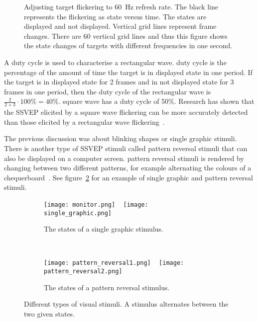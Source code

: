 \begin{figure}[h]
	\centering
	
	\caption{Adjusting target flickering to \SI{60}{Hz} refresh rate. The black line represents the flickering as state versus time. The states are displayed and not displayed. Vertical grid lines represent frame changes. There are 60 vertical grid lines and thus this figure shows the state changes of targets with different frequencies in one second.}
	\label{fig:flickering}
\end{figure}
A \gls{duty cycle} is used to characterise a \gls{rectangular wave}. \Gls{duty cycle} is the percentage of the amount of time the \gls{target} is in displayed \gls{state} in one period. If the target is in displayed \gls{state} for 2 \glspl{frame} and in not displayed \gls{state} for 3 \glspl{frame} in one period, then the \gls{duty cycle} of the \gls{rectangular wave} is $\frac{2}{2+3}\cdot 100\%=40\%$. \Gls{square wave} has a \gls{duty cycle} of 50\%. Research has shown that the \gls{SSVEP} elicited by a \gls{square wave} \gls{flickering} can be more accurately detected than those elicited by a \gls{rectangular wave} \gls{flickering}~\cite{ssvep_stim}.

The previous discussion was about blinking shapes or \gls{single graphic} stimuli. There is another type of \gls{SSVEP} stimuli called \gls{pattern reversal} stimuli that can also be displayed on a computer screen. \Gls{pattern reversal} stimuli is rendered by changing between two different patterns, for example alternating the colours of a chequerboard~\cite{ssvep_stim}. See figure~\ref{fig:stimuli} for an example of \gls{single graphic} and \gls{pattern reversal} stimuli.

\begin{figure}[h!]
	\centering
	\begin{subfigure}{0.48\textwidth}
		\texttt{[image: monitor.png]}
		~
		\texttt{[image: single\_graphic.png]}
		\caption{The states of a single graphic stimulus.}
	\end{subfigure}
	~
	\begin{subfigure}{0.48\textwidth}
		\texttt{[image: pattern\_reversal1.png]}
		~
		\texttt{[image: pattern\_reversal2.png]}
		\caption{The states of a pattern reversal stimulus.}
	\end{subfigure}
	\caption{Different types of visual stimuli. A stimulus alternates between the two given states.}
	\label{fig:stimuli}
\end{figure}

